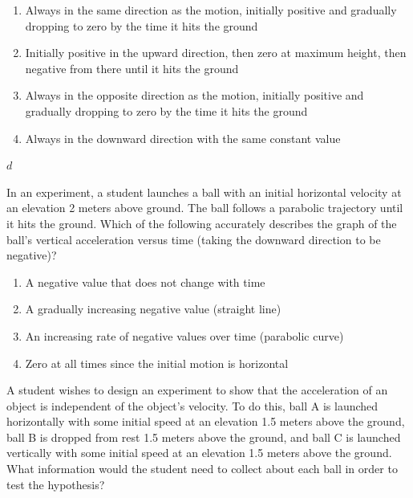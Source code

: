 \documentclass[
]{book}
\providecommand{\tightlist}{%
  \setlength{\itemsep}{0pt}\setlength{\parskip}{0pt}}
\begin{document}
\begin{enumerate}
\def\labelenumi{\alph{enumi}.}
\tightlist
\item
  Always in the same direction as the motion, initially positive and
  gradually dropping to zero by the time it hits the ground
\item
  Initially positive in the upward direction, then zero at maximum
  height, then negative from there until it hits the ground
\item
  Always in the opposite direction as the motion, initially positive
  and gradually dropping to zero by the time it hits the ground
\item
  Always in the downward direction with the same constant value
\end{enumerate}

\leavevmode{}%
\(d\)

\hypertarget{fs-id895568}{}
\leavevmode{}%
In an experiment, a student launches a ball with an initial horizontal
velocity at an elevation 2 meters above ground. The ball follows a
parabolic trajectory until it hits the ground. Which of the following
accurately describes the graph of the ball's vertical acceleration
versus time (taking the downward direction to be negative)?

\begin{enumerate}
\def\labelenumi{\alph{enumi}.}
\tightlist
\item
  A negative value that does not change with time
\item
  A gradually increasing negative value (straight line)
\item
  An increasing rate of negative values over time (parabolic curve)
\item
  Zero at all times since the initial motion is horizontal
\end{enumerate}

\hypertarget{fs-id1462671}{}
\leavevmode{}%
A student wishes to design an experiment to show that the acceleration
of an object is independent of the object's velocity. To do this, ball
A is launched horizontally with some initial speed at an elevation 1.5
meters above the ground, ball B is dropped from rest 1.5 meters above
the ground, and ball C is launched vertically with some initial speed at
an elevation 1.5 meters above the ground. What information would the
student need to collect about each ball in order to test the hypothesis?
\end{document}
